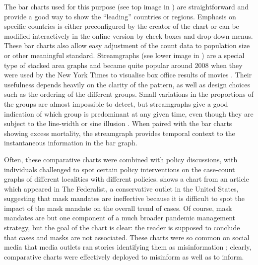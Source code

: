 \documentclass[article]{jdssv}\usepackage[]{graphicx}\usepackage[]{xcolor}
\begin{document}
The bar charts used for this purpose (see top image in ) are straightforward and provide a good way to show the ``leading'' countries or regions. Emphasis on specific countries is either preconfigured by the creator of the chart or can be modified interactively in the online version by check boxes and drop-down menus. These bar charts also allow easy adjustment of the count data to population size or other meaningful standard. Streamgraphs (see lower image in ) are a special type of stacked area graphs and became quite popular around 2008 when they were used by the New York Times to visualise box office results of movies \citep{streamgraph}. Their usefulness depends heavily on the clarity of the pattern, as well as design choices such as the ordering of the different groups. Small variations in the proportions of the groups are almost impossible to detect, but streamgraphs give a good indication of which group is predominant at any given time, even though they are subject to the line-width or sine illusion \citep{vanderplasSignsSineIllusion2015}. When paired with the bar charts showing excess mortality, the streamgraph provides temporal context to the instantaneous information in the bar graph.

Often, these comparative charts were combined with policy discussions, with individuals challenged to spot certain policy interventions on the case-count graphs of different localities with different policies\citep{weissThese12Graphs2020}.  shows a chart from an article which appeared in The Federalist, a conservative outlet in the United States, suggesting that mask mandates are ineffective because it is difficult to spot the impact of the mask mandate on the overall trend of cases. Of course, mask mandates are but one component of a much broader pandemic management strategy, but the goal of the chart is clear: the reader is supposed to conclude that cases and masks are not associated. These charts were so common on social media that media outlets ran stories identifying them as misinformation \citep{reutersstaffFactCheckMask2020}; clearly, comparative charts were effectively deployed to misinform as well as to inform.
\end{document}
